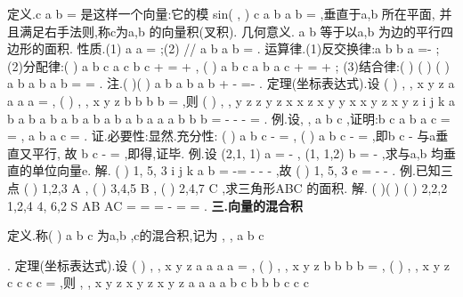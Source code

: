 \textcolor{lyred}{定义}.c
a
b
=
\times 
\rho 
\rho 
\rho 
是这样一个向量:它的模
\cdot 
sin( , )
c
a b
a b
=
\rho 
\rho 
\rho 
\rho 
\rho 
,垂直于a\rho ,b
\rho 
所在平面, 
并且满足\textcolor{lyred}{右手法则},称c\rho 为a\rho ,b
\rho 
的\textcolor{lyred}{向量积(叉积)}. 
\textcolor{lyred}{几何意义}. a b
\times 
\rho 
\rho 
等于以a\rho ,b
\rho 
为边的平行四边形的面积. 
\textcolor{lyred}{性质}.(1)
a
a
\times 
=
\rho 
\rho 
\rho 
;(2)
//
a
b
a
b
\Leftrightarrow 
\times 
=
\rho 
\rho 
\rho 
\rho 
\rho 
. 
\textcolor{lyred}{运算律}.(1)\textcolor{lyred}{反交换律}:a
b
b
a
\times 
=-\times 
\rho 
\rho 
\rho 
\rho ; 
(2)\textcolor{lyred}{分配律}:(
)
a
b
c
a
c
b
c
+
\times 
=
\times 
+
\times 
\rho 
\rho 
\rho 
\rho 
\rho 
\rho 
\rho ,
(
)
a
b
c
a b
a
c
\times 
+
=
\times 
+
\times 
\rho 
\rho 
\rho 
\rho 
\rho 
\rho 
\rho ; 
(3)\textcolor{lyred}{结合律}:(
)
(
)
(
)
a
b
a
b
a
b
\lambda 
\lambda 
\lambda 
\times 
=
\times 
=
\times 
\rho 
\rho 
\rho 
\rho 
\rho 
\rho 
. 
\textcolor{lyred}{注}.(
)(
)
a
b
a
b
a
b
+
\times 
-
=-
\times 
\rho 
\rho 
\rho 
\rho 
\rho 
\rho 
. 
\textcolor{lyred}{定理(坐标表达式)}.设
(
)
,
,
x
y
z
a
a a a
=
\rho 
,
(
)
,
,
x
y
z
b
b b b
=
\rho 
,则 
(
)
,
,
y
z
z
y
z
x
x
z
x
y
y
x
x
y
z
x
y
z
i
j
k
a
b
a b
a b a b
a b a b
a b
a
a
a
b
b
b
\times 
=
-
-
-
=
\rho 
\rho 
\rho 
\rho 
\rho 
. 
\textcolor{lyred}{例}.设, ,
a b c \neq 
\rho 
\rho 
\rho 
\rho 
,证明:b
c
a b
a c
=
\Leftrightarrow 
\cdots 
=
\cdots 
\rho 
\rho 
\rho 
\rho 
\rho \rho , a
b
a
c
\times 
=
\times 
\rho 
\rho 
\rho 
\rho . 
证.必要性:显然.充分性:
(
)
a
b
c
\cdots 
-
=
\rho 
\rho 
\rho 
,
(
)
a
b
c
\times 
-
=
\rho 
\rho 
\rho 
,即b
c
-
\rho 
\rho 与a\rho 垂直又平行, 
故
b
c
-
=
\rho 
\rho 
\rho 
,即得,证毕. 
\textcolor{lyred}{例}.设
(2,1, 1)
a =
-
\rho 
,
(1, 1,2)
b =
-
,求与a\rho ,b
\rho 
均垂直的单位向量e\rho . 
解.
(
)
1, 5, 3
i
j
k
a
b
\times 
=
-=
-
-
-
\rho 
\rho 
\rho 
\rho 
\rho 
,故
(
)
1, 5, 3
e =\pm 
-
-
\rho 
. 
\textcolor{lyred}{例}.已知三点
(
)
1,2,3
A
, (
)
3,4,5
B
,
(
)
2,4,7
C
,求三角形ABC 的面积. 
解.
(
)(
)
(
)
2,2,2
1,2,4
4, 6,2
S
AB
AC
=
\times 
=
\times 
=
-
=
=
\xi \xi \xi \rho 
\xi \xi \xi \rho 
. 
\vspace{4pt}
{\bfseries \textcolor{lyred}{三.向量的混合积}}

\textcolor{lyred}{定义}.称(
)
a
b
c
\times 
\cdots 
\rho 
\rho 
\rho 为a\rho ,b
\rho 
,c\rho 的\textcolor{lyred}{混合积},记为
, ,
a b c




\rho 
\rho 
\rho . 
\textcolor{lyred}{定理(坐标表达式)}.设
(
)
,
,
x
y
z
a
a a
a
=
\rho 
,
(
)
,
,
x
y
z
b
b b b
=
\rho 
,
(
)
,
,
x
y
z
c
c c c
=
\rho 
,则 
, ,
x
y
z
x
y
z
x
y
z
a
a
a
a b c
b
b
b
c
c
c

